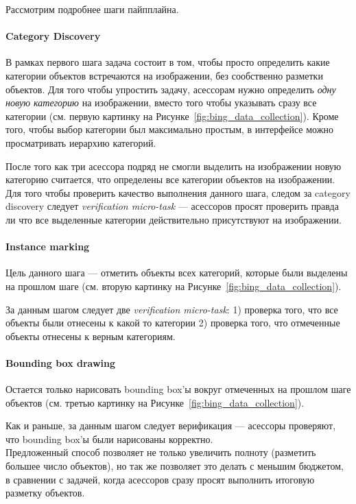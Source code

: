 Рассмотрим подробнее шаги пайпплайна.

\paragraph{Category Discovery} В рамках первого шага задача состоит в том, чтобы просто определить какие категории объектов встречаются на изображении, без сообственно разметки объектов.
Для того чтобы упростить задачу, асессорам нужно определить \textit{одну новую категорию} на изображении, вместо того чтобы указывать сразу все категории (см. первую картинку на Рисунке~\ref{fig:bing_data_collection}).
Кроме того, чтобы выбор категории был максимально простым, в интерфейсе можно просматривать иерархию категорий.

После того как три асессора подряд не смогли выделить на изображении новую категорию считается, что определены все категории объектов на изображении. \\

Для того чтобы проверить качество выполнения данного шага, следом за category discovery следует \textit{verification micro-task} --- асессоров просят проверить правда ли что все выделенные категории действительно присутствуют на изображении.

\paragraph{Instance marking} Цель данного шага --- отметить объекты всех категорий, которые были выделены на прошлом шаге (см. вторую картинку на Рисунке~\ref{fig:bing_data_collection}). 

За данным шагом следует две \textit{verification micro-task}: 1) проверка того, что все объекты были отнесены к какой то категории 2) проверка того, что отмеченные объекты отнесены к верным категориям.

\paragraph{Bounding box drawing} Остается только нарисовать bounding box'ы вокруг отмеченных на прошлом шаге объектов (см. третью картинку на Рисунке~\ref{fig:bing_data_collection}).

Как и раньше, за данным шагом следует верификация --- асессоры проверяют, что bounding box'ы были нарисованы корректно. \\

Предложенный способ позволяет не только увеличить полноту (разметить большее число объектов), но так же позволяет это делать с меньшим бюджетом, в сравнении с задачей, когда асессоров сразу просят выполнить итоговую разметку объектов. \\

